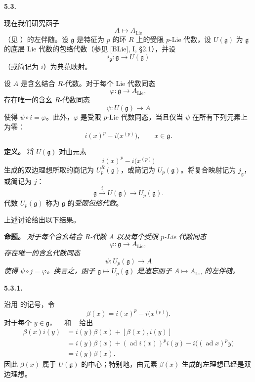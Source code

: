 
\medskip
\noindent\textbf{5.3.}
\label{sga3:VIIA:5.3}

现在我们研究函子
\[
  A\longmapsto A_{\mathrm{Lie}}
\]
（见 ）的左伴随。设 \(\mathfrak g\) 是特征为 \(p\) 的环 \(R\) 上的受限 \(p\)-Lie 代数，设
\(U(\mathfrak g)\) 为 \(\mathfrak g\) 的底层 Lie 代数的包络代数（参见 \textup{[BLie]}, I, \S2.1），并设
\[
  i_{\mathfrak g}:\mathfrak g\longrightarrow U(\mathfrak g)
\]
（或简记为 \(i\)）为典范映射。

设 \(A\) 是含幺结合 \(R\)-代数。对于每个 Lie 代数同态
\[
  \varphi:\mathfrak g\longrightarrow A_{\mathrm{Lie}},
\]
存在唯一的含幺 \(R\)-代数同态
\[
  \psi:U(\mathfrak g)\longrightarrow A
\]
使得 \(\psi\circ i=\varphi\)。此外，\(\varphi\) 是受限 \(p\)-Lie 代数同态，当且仅当 \(\psi\) 在所有下列元素上为零：
\[
  i(x)^p-i\bigl(x^{(p)}\bigr),
  \qquad x\in\mathfrak g.
\]

\noindent\textbf{定义。}
将 \(U(\mathfrak g)\) 对由元素
\[
  i(x)^p-i\bigl(x^{(p)}\bigr)
\]
生成的双边理想所取的商记为 \(U_p^R(\mathfrak g)\)，或简记为
\(U_p(\mathfrak g)\)。将复合映射记为 \(j_{\mathfrak g}\)，或简记为 \(j\)：
\[
  \mathfrak g
  \xrightarrow{i}
  U(\mathfrak g)
  \longrightarrow
  U_p(\mathfrak g).
\]
代数 \(U_p(\mathfrak g)\) 称为 \(\mathfrak g\) 的\emph{受限包络代数}。

上述讨论给出以下结果。

\medskip
\noindent\textbf{命题。}
\textit{对于每个含幺结合 \(R\)-代数 \(A\) 以及每个受限 \(p\)-Lie 代数同态
\[
  \varphi:\mathfrak g\longrightarrow A_{\mathrm{Lie}},
\]
存在唯一的含幺代数同态
\[
  \psi:U_p(\mathfrak g)\longrightarrow A
\]
使得 \(\psi\circ j=\varphi\)。换言之，函子
\(\mathfrak g\mapsto U_p(\mathfrak g)\) 是遗忘函子 \(A\mapsto A_{\mathrm{Lie}}\) 的左伴随。}

\medskip
\noindent\textbf{5.3.1.}
\label{sga3:VIIA:5.3.1}

沿用  的记号，令
\[
  \beta(x)=i(x)^p-i\bigl(x^{(p)}\bigr).
\]
对于每个 \(y\in\mathfrak g\)， ~ 和 ~
给出
\[
\begin{aligned}
  \beta(x)i(y)
  &=
  i(y)\beta(x)+[\beta(x),i(y)]\\
  &=
  i(y)\beta(x)
  +(\operatorname{ad}i(x))^p i(y)
  -i\bigl((\operatorname{ad}x)^p y\bigr)\\
  &=
  i(y)\beta(x).
\end{aligned}
\]
因此 \(\beta(x)\) 属于 \(U(\mathfrak g)\) 的中心；特别地，由元素
\(\beta(x)\) 生成的左理想已经是双边理想。

